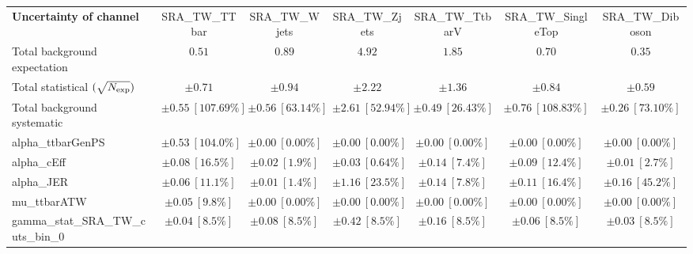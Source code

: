 
\begin{sidewaystable}
\begin{center}
\setlength{\tabcolsep}{0.0pc}
\begin{tabular*}{\textwidth}{@{\extracolsep{\fill}}lcccccc}
\noalign{\smallskip}\hline\noalign{\smallskip}
{\bf Uncertainty of channel}                                    & SRA\_TW\_TTbar            & SRA\_TW\_Wjets            & SRA\_TW\_Zjets            & SRA\_TW\_TtbarV            & SRA\_TW\_SingleTop            & SRA\_TW\_Diboson            \\
\noalign{\smallskip}\hline\noalign{\smallskip}
Total background expectation             &  $0.51$        &  $0.89$        &  $4.92$        &  $1.85$        &  $0.70$        &  $0.35$       \\
\noalign{\smallskip}\hline\noalign{\smallskip}
Total statistical $(\sqrt{N_{\rm exp}})$              & $\pm 0.71$        & $\pm 0.94$        & $\pm 2.22$        & $\pm 1.36$        & $\pm 0.84$        & $\pm 0.59$       \\
Total background systematic               & $\pm 0.55\ [107.69\%] $        & $\pm 0.56\ [63.14\%] $        & $\pm 2.61\ [52.94\%] $        & $\pm 0.49\ [26.43\%] $        & $\pm 0.76\ [108.83\%] $        & $\pm 0.26\ [73.10\%] $             \\
\noalign{\smallskip}\hline\noalign{\smallskip}
\noalign{\smallskip}\hline\noalign{\smallskip}
alpha\_ttbarGenPS         & $\pm 0.53\ [104.0\%] $          & $\pm 0.00\ [0.00\%] $          & $\pm 0.00\ [0.00\%] $          & $\pm 0.00\ [0.00\%] $          & $\pm 0.00\ [0.00\%] $          & $\pm 0.00\ [0.00\%] $       \\
alpha\_cEff         & $\pm 0.08\ [16.5\%] $          & $\pm 0.02\ [1.9\%] $          & $\pm 0.03\ [0.64\%] $          & $\pm 0.14\ [7.4\%] $          & $\pm 0.09\ [12.4\%] $          & $\pm 0.01\ [2.7\%] $       \\
alpha\_JER         & $\pm 0.06\ [11.1\%] $          & $\pm 0.01\ [1.4\%] $          & $\pm 1.16\ [23.5\%] $          & $\pm 0.14\ [7.8\%] $          & $\pm 0.11\ [16.4\%] $          & $\pm 0.16\ [45.2\%] $       \\
mu\_ttbarATW         & $\pm 0.05\ [9.8\%] $          & $\pm 0.00\ [0.00\%] $          & $\pm 0.00\ [0.00\%] $          & $\pm 0.00\ [0.00\%] $          & $\pm 0.00\ [0.00\%] $          & $\pm 0.00\ [0.00\%] $       \\
gamma\_stat\_SRA\_TW\_cuts\_bin\_0         & $\pm 0.04\ [8.5\%] $          & $\pm 0.08\ [8.5\%] $          & $\pm 0.42\ [8.5\%] $          & $\pm 0.16\ [8.5\%] $          & $\pm 0.06\ [8.5\%] $          & $\pm 0.03\ [8.5\%] $       \\

\end{tabular*}
\end{center}
\end{sidewaystable}
